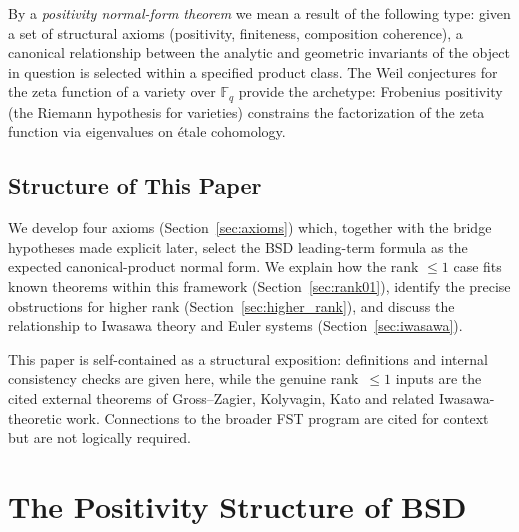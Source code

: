 \documentclass[aps,prd,twocolumn,superscriptaddress,nofootinbib,floatfix]{revtex4-2}
\theoremstyle{definition}
\theoremstyle{remark}
\begin{document}
By a \textit{positivity normal-form theorem} we mean a result of the following type: given a set of structural axioms (positivity, finiteness, composition coherence), a canonical relationship between the analytic and geometric invariants of the object in question is selected within a specified product class. The Weil conjectures for the zeta function of a variety over $\mathbb{F}_q$ provide the archetype: Frobenius positivity (the Riemann hypothesis for varieties) constrains the factorization of the zeta function via eigenvalues on étale cohomology.

\subsection{Structure of This Paper}

We develop four axioms (Section~\ref{sec:axioms}) which, together with the bridge hypotheses made explicit later, select the BSD leading-term formula as the expected canonical-product normal form. We explain how the rank $\leq 1$ case fits known theorems within this framework (Section~\ref{sec:rank01}), identify the precise obstructions for higher rank (Section~\ref{sec:higher_rank}), and discuss the relationship to Iwasawa theory and Euler systems (Section~\ref{sec:iwasawa}).

This paper is self-contained as a structural exposition: definitions and internal consistency checks are given here, while the genuine rank~$\leq 1$ inputs are the cited external theorems of Gross--Zagier, Kolyvagin, Kato and related Iwasawa-theoretic work. Connections to the broader FST program are cited for context but are not logically required.


\clearpage
\section{The Positivity Structure of BSD}
\label{sec:positivity}
\end{document}
